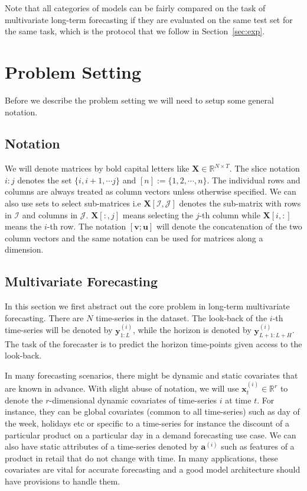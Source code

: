 \documentclass[10pt]{article} \usepackage[accepted]{tmlr}
\theoremstyle{plain}
\theoremstyle{definition}
\theoremstyle{remark}
\newcommand{\reals}{\mathbb{R}}
\newcommand{\ab}{{\bm{a}}}
\newcommand{\ub}{{\bm{u}}}
\newcommand{\vb}{{\bm{v}}}
\newcommand{\xb}{{\bm{x}}}
\newcommand{\ba}{\ab}
\newcommand{\bu}{\ub}
\newcommand{\bv}{\vb}
\newcommand{\bx}{\xb}
\newcommand{\bX}{\bm{{X}}}
\newcommand{\cI}{\mathcal{I}}
\newcommand{\cJ}{\mathcal{J}}
\def\*#1{\mathbf{#1}}
\begin{document}
Note that all categories of models can be fairly compared on the task of multivariate long-term forecasting if they are evaluated on the same test set for the same task, which is the protocol that we follow in Section~\ref{sec:exp}.


\section{Problem Setting}
\label{sec:psetting}
Before we describe the problem setting we will need to setup some general notation.

\subsection{Notation}
We will denote matrices by bold capital letters like $\bX \in \reals^{N \times T}$. The slice notation $i:j$ denotes the set $\{i, i+1, \cdots j\}$ and $[n]:= \{1, 2, \cdots, n\}$. The individual rows and columns are always treated as column vectors unless otherwise specified. We can also use sets to select sub-matrices i.e $\bX[\cI, \cJ]$ denotes the sub-matrix with rows in $\cI$ and columns in $\cJ$. $\bX[:, j]$ means selecting the $j$-th column while $\bX[i, :]$ means the $i$-th row. The notation $[\bv; \bu]$ will denote the concatenation of the two column vectors and the same notation can be used for matrices along a dimension.

\subsection{Multivariate Forecasting}
\label{sec:probfor}
In this section we first abstract out the core problem in long-term multivariate forecasting. There are $N$ time-series in the dataset. The look-back of the $i$-th time-series will be denoted by $\*y^{(i)}_{1:L}$, while the horizon is denoted by $\*y^{(i)}_{L+1:L+H}$. The task of the forecaster is to predict the horizon time-points given access to the look-back.

In many forecasting scenarios, there might be dynamic and static covariates that are known in advance. With slight abuse of notation, we will use $\bx^{(i)}_t \in \reals^{r}$ to denote the $r$-dimensional dynamic covariates of time-series $i$ at time $t$. For instance, they can be global covariates (common to all time-series) such as day of the week, holidays etc or specific to a time-series for instance the discount of a particular product on a particular day in a demand forecasting use case. We can also have static attributes of a time-series denoted by $\ba^{(i)}$ such as features of a product in retail that do not change with time. In many applications, these covariates are vital for accurate forecasting and a good model architecture should have provisions to handle them.
\end{document}
